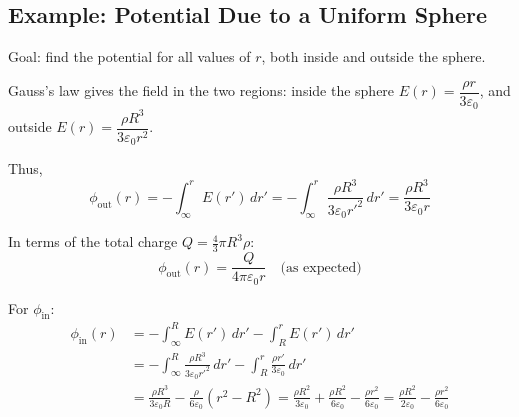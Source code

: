\subsection*{Example: Potential Due to a Uniform Sphere}

\begin{example}
Goal: find the potential for all values of $r$, both inside and outside the sphere.

Gauss's law gives the field in the two regions: inside the sphere $E(r) = \dfrac{\rho r}{3\varepsilon_0}$, and outside $E(r) = \dfrac{\rho R^3}{3\varepsilon_0 r^2}$.

Thus,
\[
  \phi_\text{out}(r) = -\int_\infty^r E(r')\,dr'
  = -\int_\infty^r \frac{\rho R^3}{3\varepsilon_0 r'^2}\,dr'
  = \frac{\rho R^3}{3\varepsilon_0 r}
\]

In terms of the total charge $Q = \frac{4}{3}\pi R^3 \rho$:
\[
  \phi_\text{out}(r) = \frac{Q}{4\pi\varepsilon_0 r} \quad \text{(as expected)}
\]

For $\phi_\text{in}$:
\begin{align*}
  \phi_\text{in}(r)
  &= -\int_\infty^R E(r')\,dr' - \int_R^r E(r')\,dr' \\
  &= -\int_\infty^R \frac{\rho R^3}{3\varepsilon_0 r'^2}\,dr'
     - \int_R^r \frac{\rho r'}{3\varepsilon_0}\,dr' \\
  &= \frac{\rho R^3}{3\varepsilon_0 R} - \frac{\rho}{6\varepsilon_0}(r^2 - R^2)
   = \frac{\rho R^2}{3\varepsilon_0} + \frac{\rho R^2}{6\varepsilon_0} - \frac{\rho r^2}{6\varepsilon_0}
   = \frac{\rho R^2}{2\varepsilon_0} - \frac{\rho r^2}{6\varepsilon_0}
\end{align*}


\end{example}
